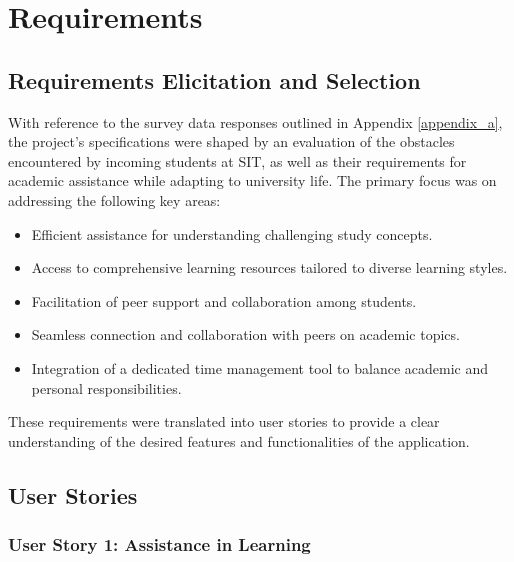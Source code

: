 
\chapter{Requirements}\label{requirements}

\section{Requirements Elicitation and Selection}

With reference to the survey data responses outlined in Appendix \ref{appendix_a}, the project's specifications were shaped by an evaluation of the obstacles encountered by incoming students at SIT, as well as their requirements for academic assistance while adapting to university life. The primary focus was on addressing the following key areas:

\begin{itemize}
  \item Efficient assistance for understanding challenging study concepts.
  \item Access to comprehensive learning resources tailored to diverse learning styles.
  \item Facilitation of peer support and collaboration among students.
  \item Seamless connection and collaboration with peers on academic topics.
  \item Integration of a dedicated time management tool to balance academic and personal responsibilities.
\end{itemize}

These requirements were translated into user stories to provide a clear understanding of the desired features and functionalities of the application.

\section{User Stories}

\subsection{User Story 1: Assistance in Learning}

